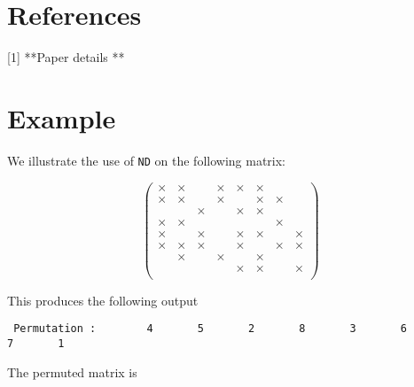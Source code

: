\section*{References}
[1] **Paper details **




\section{Example}

We illustrate the use of {\tt ND} on the following matrix: 

$$
	\left(\begin{array}{cccccccc}
   \times &  \times  &         &  \times  &  \times  & \times &          &           \\
   \times &  \times  &         &  \times  &          & \times &  \times  &           \\ 
          &          & \times  &          &  \times  & \times &          &           \\
   \times &  \times  &         &          &          &        &  \times  &           \\ 
   \times &          & \times  &          &  \times  & \times &          &   \times  \\ 
   \times &  \times  & \times  &          &  \times  &        &  \times  &   \times  \\ 
          &  \times  &         &  \times  &          & \times &          &           \\ 
          &          &         &          &  \times  & \times &          &   \times  \\ 
	\end{array}\right)
$$


\smallskip



\noindent
{This produces the following output}

\begin{verbatim}
 Permutation :        4       5       2       8       3       6       7       1
\end{verbatim}

\noindent
{\rm The permuted matrix is}

